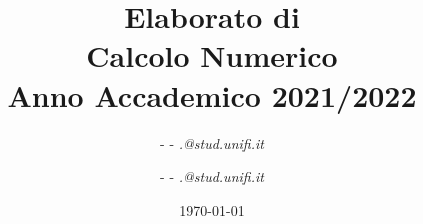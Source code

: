\documentclass[a4paper]{article}
\date{\today}
\begin{document}
\title{\vspace{2cm}Elaborato di\\ \textbf{Calcolo Numerico}\\ Anno Accademico 2021/2022\vspace{3cm}}

\author{\wirterOneName{} \emph{\wirterOneSurname{}} - \texttt{\wirterOneId{}} - \textit{\MakeLowercase{\wirterOneName{}}.\MakeLowercase{\wirterOneSurname{}}@stud.unifi.it}
  \and \wirterTwoName{} \emph{\wirterTwoSurname{}} - \texttt{\wirterTwoId{}} - \textit{\MakeLowercase{\wirterTwoName{}}.\MakeLowercase{\wirterTwoSurname{}}@stud.unifi.it}}


\maketitle
\newpage
\tableofcontents
\newpage
\listoffigures
\listoftables


\newpage







\newpage
{}
\end{document}
